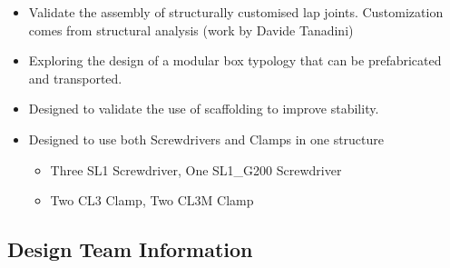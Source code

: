 \begin{itemize}
	\item Validate the assembly of structurally customised lap joints. Customization comes from structural analysis (work by Davide Tanadini)

	\item Exploring the design of a modular box typology that can be prefabricated and transported.

	\item Designed to validate the use of scaffolding to improve stability.

	\item Designed to use both Screwdrivers and Clamps in one structure

\begin{itemize}
	\item Three SL1 Screwdriver, One SL1\_G200 Screwdriver

	\item Two CL3 Clamp, Two CL3M Clamp

\end{itemize}
\end{itemize}
\subsection{Design Team Information}


